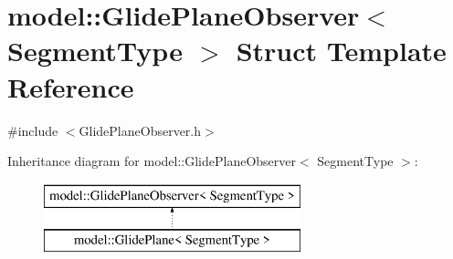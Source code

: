 \hypertarget{structmodel_1_1_glide_plane_observer}{}\section{model\+:\+:Glide\+Plane\+Observer$<$ Segment\+Type $>$ Struct Template Reference}
\label{structmodel_1_1_glide_plane_observer}


{\ttfamily \#include $<$Glide\+Plane\+Observer.\+h$>$}

Inheritance diagram for model\+:\+:Glide\+Plane\+Observer$<$ Segment\+Type $>$\+:\begin{figure}[H]
\begin{center}
\leavevmode
\includegraphics[height=2.000000cm]{structmodel_1_1_glide_plane_observer}
\end{center}
\end{figure}
